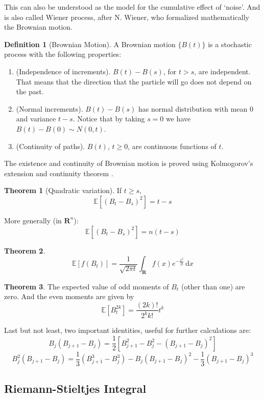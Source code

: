 \documentclass[12pt,a4paper]{article}
\theoremstyle{definition}
\newtheorem{theorem}{Theorem}[section]
\newtheorem{definition}{Definition}[section]
\begin{document}
This can also be understood as the model for the cumulative effect of `noise'. And is also called Wiener process, after N. Wiener, who formalized mathematically the Brownian motion.

\begin{definition}[Brownian Motion]
	A Brownian motion $\{ B(t) \}$ is a stochastic process with the following properties:
	\begin{enumerate}
		\item (Independence of increments). $B(t) - B(s)$, for $t > s$, are independent. That means that the direction that the particle will go does not depend on the past.
		\item (Normal increments). $B(t) - B(s)$ has normal distribution with mean $0$ and variance $t - s$. Notice that by taking $s = 0$ we have $B(t) - B(0) \sim N(0,t)$.
		\item (Continuity of paths). $B(t)$, $t \geq 0$, are continuous functions of $t$. 
	\end{enumerate}
\end{definition}

The existence and continuity of Brownian motion is proved using Kolmogorov's extension and continuity theorem \cite{oksendal2013stochastic}.

\begin{theorem}[Quadratic variation]
	If $t \geq s$,
	\[
		\mathbb{E}[(B_t - B_s)^2] = t - s
	\]
	
	More generally (in $\textbf{R}^n$):
	\[
		\mathbb{E}[(B_t - B_s)^2] = n(t - s)
	\]
\end{theorem}


\begin{theorem}
	\[
		\mathbb{E}[f(B_t)] = \frac{1}{\sqrt{2 \pi t}} \int_{\textbf{R}} f(x) e^{-\frac{x^2}{2t}} \, \mathrm{d}x
	\]
\end{theorem}

\begin{theorem}
	The expected value of odd moments of $B_t$ (other than one) are zero. And the even moments are given by
	\[
		\mathbb{E}[B_t^{2k}] = \frac{(2k)!}{2^k k!} t^k
	\]
\end{theorem}

Last but not least, two important identities, useful for further calculations are:
\[
	B_j (B_{j+1} - B_j) = \frac{1}{2} [B_{j+1}^2 - B_j^2 - (B_{j+1} - B_j)^2]
\]
\[
	B_j^2 (B_{j+1} - B_j) = \frac{1}{3} (B_{j+1}^3 - B_j^3) - B_j(B_{j+1} - B_j)^2 - \frac{1}{3}(B_{j+1} - B_j)^3
\]

\subsection{Riemann-Stieltjes Integral}
\end{document}
